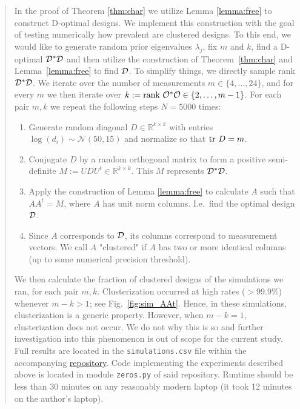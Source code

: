 \begin{quote} %
  In the proof of Theorem \ref{thm:char} we utilize Lemma
  \ref{lemma:free} to construct D-optimal designs. We implement this
  construction with the goal of testing numerically how prevalent are
  clustered designs. To this end, we would like to generate random
  prior eigenvalues $\lambda_j$, fix $m$ and $k$, find a D-optimal
  $\mathcal{D}^*\mathcal{D}$ and then utilize the construction of
  Theorem~\ref{thm:char} and Lemma~\ref{lemma:free} to find $\mathcal{D}$.
  \newline
  To simplify things, we directly sample rank $\mathcal{D}^*\mathcal{D}$. We iterate
  over the number of measurements $m \in \{4,\dots, 24\}$, and for
  every $m$ we then iterate over $k:=\textup{rank}\  \mathcal{O}^*\mathcal{O} \in \{2,\dots,
  m-1\}$. For each pair $m,k$ we repeat the following steps $N=5000$
  times:
  \begin{enumerate}
  \item Generate random diagonal $D\in \mathbb{R}^{k\times k}$ with
    entries $\log (d_i) \sim \mathcal{N}(50,15)$ and normalize so that
    $\textup{tr}\ D = m$.
  \item Conjugate $D$ by a random orthogonal matrix to form a positive
    semi-definite $M := UDU^t \in \mathbb{R}^{k\times k}$. This $M$
    represents $\mathcal{D}^*\mathcal{D}$.
  \item Apply the construction of Lemma \ref{lemma:free} to calculate
    $A$ such that $AA^t = M$, where $A$ has unit norm
    columns. I.e.~find the optimal design $\mathcal{D}$.
  \item Since $A$ corresponds to $\mathcal{D}$, its columns correspond to
    measurement vectors. We call $A$ "clustered" if $A$ has two or
    more identical columns (up to some numerical precision threshold).
  \end{enumerate}
  We then calculate the fraction of clustered designs of the
  simulations we ran, for each pair $m,k$. Clusterization occurred at
  high rates ($>99.9\%$) whenever $m-k > 1$; see
  Fig.~\ref{fig:sim_AAt}. Hence, in these simulations, clusterization
  is a generic property. However, when $m-k = 1$, clusterization does
  not occur. We do not why this is so and further investigation into
  this phenomenon is out of scope for the current study.
  \newline
  Full results are located in the \texttt{simulations.csv} file within
  the accompanying \href{https://github.com/yairdaon/OED}{repository}.
  Code implementing the experiments described above is located in
  module \texttt{zeros.py} of said repository. Runtime should be less
  than 30 minutes on any reasonably modern laptop (it took 12 minutes
  on the author's laptop).
\end{quote}

